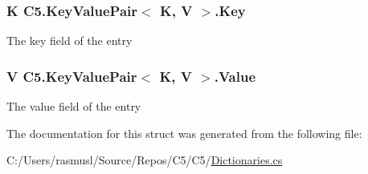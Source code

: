 \subsubsection[{Key}]{\setlength{\rightskip}{0pt plus 5cm}K {\bf C5.\+Key\+Value\+Pair}$<$ K, V $>$.Key}\label{struct_c5_1_1_key_value_pair_a17906f06fc12d12bd43c9b99f41ebb66}


The key field of the entry 

\hypertarget{struct_c5_1_1_key_value_pair_ab40dcc96269636dfc071c0a61fc5e1bc}{}
\subsubsection[{Value}]{\setlength{\rightskip}{0pt plus 5cm}V {\bf C5.\+Key\+Value\+Pair}$<$ K, V $>$.Value}\label{struct_c5_1_1_key_value_pair_ab40dcc96269636dfc071c0a61fc5e1bc}


The value field of the entry 



The documentation for this struct was generated from the following file\+:\begin{DoxyCompactItemize}
\item 
C\+:/\+Users/rasmusl/\+Source/\+Repos/\+C5/\+C5/\hyperlink{_dictionaries_8cs}{Dictionaries.\+cs}\end{DoxyCompactItemize}
